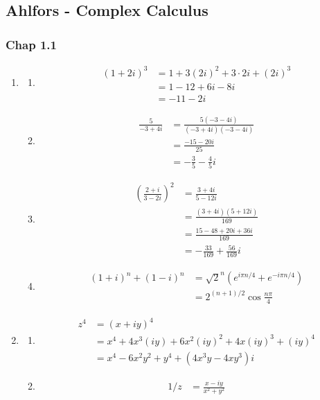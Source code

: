 \documentclass[10pt,a4paper]{book}
\theoremstyle{definition}
\begin{document}
\newpage
\subsection{{\sc Ahlfors} - Complex Calculus}
\subsubsection{Chap 1.1}
\begin{enumerate}
\item
\begin{enumerate}
\item\begin{align}
(1+2i)^3
&=1+3(2i)^2+3\cdot2i+(2i)^3\\
&=1-12+6i-8i\\
&=-11-2i
\end{align}

\item\begin{align}
\frac{5}{-3+4i}
&=\frac{5(-3-4i)}{(-3+4i)(-3-4i)}\\
&=\frac{-15-20i}{25}\\
&=-\frac{3}{5}-\frac{4}{5}i
\end{align}

\item\begin{align}
\left(\frac{2+i}{3-2i}\right)^2
&=\frac{3+4i}{5-12i}\\
&=\frac{(3+4i)(5+12i)}{169}\\
&=\frac{15-48+20i+36i}{169}\\
&=-\frac{33}{169}+\frac{56}{169}i
\end{align}

\item\begin{align}
(1+i)^n+(1-i)^n
&=\sqrt{2}^n\left(e^{i\pi n/4}+e^{-i\pi n/4}\right)\\
&=2^{(n+1)/2}\cos\frac{n\pi}{4}
\end{align}
\end{enumerate}

\item
\begin{enumerate}
\item
\begin{align}
z^4
&=(x+iy)^4\\
&=x^4+4x^3(iy)+6x^2(iy)^2+4x(iy)^3+(iy)^4\\
&=x^4-6x^2y^2+y^4+(4x^3y-4xy^3)i
\end{align}

\item\begin{align}
1/z
&=\frac{x-iy}{x^2+y^2}
\end{align}


\end{enumerate}
\end{enumerate}
\end{document}
